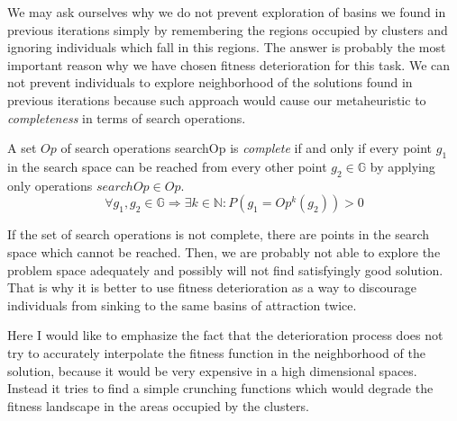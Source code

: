We may ask ourselves why we do not prevent exploration of basins 
we found in previous iterations simply by remembering the regions occupied
by clusters and ignoring individuals which fall in this regions.
The answer is probably the most important reason why we have chosen fitness
deterioration for this task. We can not prevent individuals to explore
neighborhood of the solutions found in previous iterations because such
approach would cause our metaheuristic to \textit{completeness} in terms of 
search operations.

\begin{definition}\label{completeness}
A set $Op$ of search operations searchOp is \textit{complete}
if and only if every point $g_1$ in the search space 
can be reached from every other point $g_2 \in \mathbb{G}$ by applying
only operations $searchOp \in Op$.
\begin{equation}
\forall g_1, g_2 \in \mathbb{G} \Rightarrow \exists k \in \mathbb{N}:
P(g_1=Op^k(g_2)) > 0
\end{equation} 
\end{definition}
If the set of search operations is not complete, there are points in the search space which
cannot be reached. Then, we are probably not able to explore the problem space adequately
and possibly will not find satisfyingly good solution. That is why it is better
to use fitness deterioration as a way to discourage individuals from sinking to
the same basins of attraction twice.

Here I would like to emphasize the fact that the
deterioration process does not try to accurately interpolate the fitness
function in the neighborhood of the solution, because it would be very
expensive in a high dimensional spaces. Instead it tries to find a simple
crunching functions which would degrade the fitness landscape in the areas 
occupied by the clusters.

